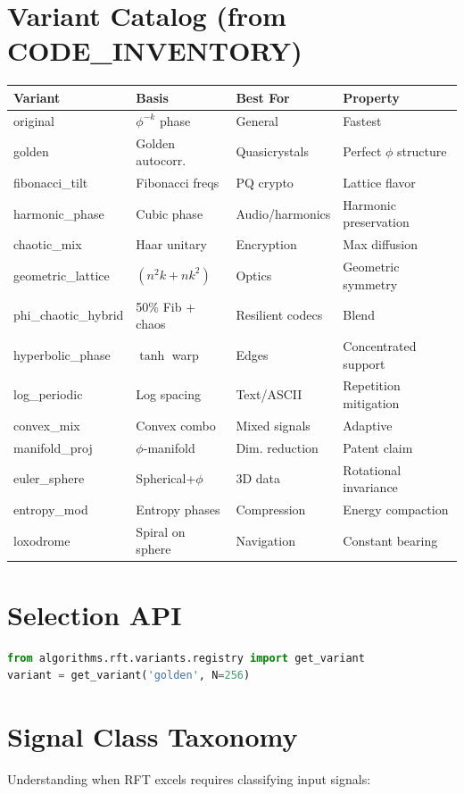 \documentclass[11pt, a4paper, openany]{book}
\theoremstyle{definition}
\begin{document}
\section{Variant Catalog (from CODE\_INVENTORY)}
\begin{table}[h]
\centering
\small
\begin{tabular}{@{}llll@{}}\toprule
Variant & Basis & Best For & Property \\ \midrule
original & $\phi^{-k}$ phase & General & Fastest \\
golden & Golden autocorr. & Quasicrystals & Perfect $\phi$ structure \\
fibonacci\_tilt & Fibonacci freqs & PQ crypto & Lattice flavor \\
harmonic\_phase & Cubic phase & Audio/harmonics & Harmonic preservation \\
chaotic\_mix & Haar unitary & Encryption & Max diffusion \\
geometric\_lattice & $(n^2 k + n k^2)$ & Optics & Geometric symmetry \\
phi\_chaotic\_hybrid & 50\% Fib + chaos & Resilient codecs & Blend \\
hyperbolic\_phase & $\tanh$ warp & Edges & Concentrated support \\
log\_periodic & Log spacing & Text/ASCII & Repetition mitigation \\
convex\_mix & Convex combo & Mixed signals & Adaptive \\
manifold\_proj & $\phi$-manifold & Dim. reduction & Patent claim \\
euler\_sphere & Spherical+$\phi$ & 3D data & Rotational invariance \\
entropy\_mod & Entropy phases & Compression & Energy compaction \\
loxodrome & Spiral on sphere & Navigation & Constant bearing \\ \bottomrule
\end{tabular}
\end{table}

\section{Selection API}
\begin{lstlisting}[language=Python]
from algorithms.rft.variants.registry import get_variant
variant = get_variant('golden', N=256)
\end{lstlisting}

\section{Signal Class Taxonomy}
Understanding when RFT excels requires classifying input signals:
\end{document}
